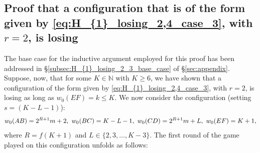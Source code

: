 \documentclass[11pt,reqno]{amsart}
\theoremstyle{definition}
\theoremstyle{definition}
\begin{document}
\subsection{Proof that a configuration that is of the form given by \eqref{eq:H_{1}_losing_2,4_case_3}, with $r=2$, is losing}\label{subsec:proof_eq_H_{1}_losing_2_3}
The base case for the inductive argument employed for this proof has been addressed in \S\ref{subsec:H_{1}_losing_2_3_base_case} of \S\ref{sec:appendix}. Suppose, now, that for some $K \in \mathbb{N}$ with $K \geqslant 6$, we have shown that a configuration of the form given by \eqref{eq:H_{1}_losing_2,4_case_3}, with $r=2$, is losing as long as $w_{0}(EF)=k \leqslant K$. We now consider the configuration (setting $s=(K-L-1)$):
\begin{align}
w_{0}(AB)=2^{R+1}m+2,\ w_{0}(BC)=K-L-1,\ w_{0}(CD)=2^{R+1}m+L,\ w_{0}(EF)=K+1,\label{eq:H_{1}_losing_2_3_inductive}
\end{align}
where $R=f(K+1)$ and $L\in\{2,3,\ldots,K-3\}$. The first round of the game played on this configuration unfolds as follows:
\end{document}

